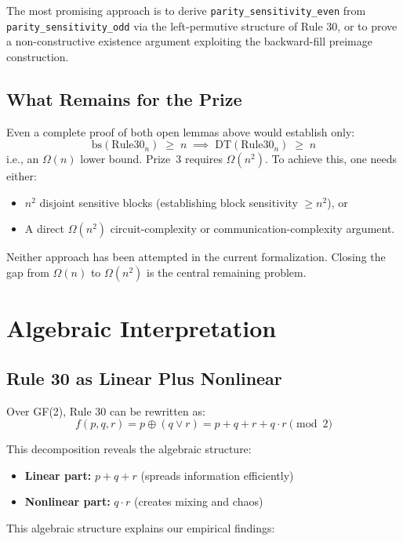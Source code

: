 \documentclass[11pt]{article}
\begin{document}
The most promising approach is to derive \texttt{parity\_sensitivity\_even} from \texttt{parity\_sensitivity\_odd} via the left-permutive structure of Rule 30, or to prove a non-constructive existence argument exploiting the backward-fill preimage construction.

\subsection{What Remains for the Prize}

Even a complete proof of both open lemmas above would establish only:
\[
  \mathrm{bs}(\mathrm{Rule30}_n) \;\geq\; n \;\implies\; \mathrm{DT}(\mathrm{Rule30}_n) \;\geq\; n
\]
i.e., an $\Omega(n)$ lower bound. Prize~3 requires $\Omega(n^2)$. To achieve this, one needs either:
\begin{itemize}
    \item $n^2$ disjoint sensitive blocks (establishing block sensitivity $\geq n^2$), or
    \item A direct $\Omega(n^2)$ circuit-complexity or communication-complexity argument.
\end{itemize}
Neither approach has been attempted in the current formalization. Closing the gap from $\Omega(n)$ to $\Omega(n^2)$ is the central remaining problem.

\section{Algebraic Interpretation}

\subsection{Rule 30 as Linear Plus Nonlinear}

Over GF(2), Rule 30 can be rewritten as:
\begin{equation}
f(p,q,r) = p \oplus (q \lor r) = p + q + r + q \cdot r \pmod{2}
\end{equation}

This decomposition reveals the algebraic structure:
\begin{itemize}
    \item \textbf{Linear part:} $p + q + r$ (spreads information efficiently)
    \item \textbf{Nonlinear part:} $q \cdot r$ (creates mixing and chaos)
\end{itemize}

This algebraic structure explains our empirical findings:
\end{document}
